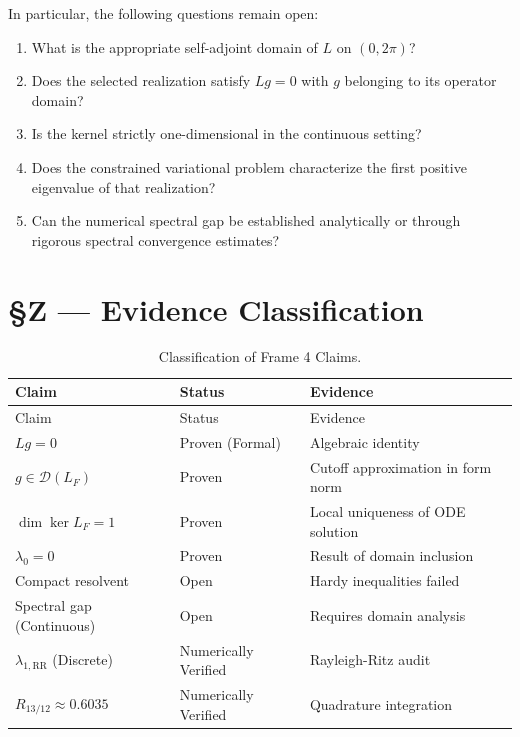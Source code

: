 \documentclass[12pt,a4paper]{article}
\begin{document}
In particular, the following questions remain open:
\begin{enumerate}
    \item What is the appropriate self-adjoint domain of \(L\) on \((0,2\pi)\)?
    \item Does the selected realization satisfy \(Lg=0\) with \(g\) belonging to its operator domain?
    \item Is the kernel strictly one-dimensional in the continuous setting?
    \item Does the constrained variational problem characterize the first positive eigenvalue of that realization?
    \item Can the numerical spectral gap be established analytically or through rigorous spectral convergence estimates?
\end{enumerate}

\section{\S Z — Evidence Classification}\label{sec:audit}

\begin{longtable}{p{4.5cm}p{6cm}p{3cm}}
\caption{Classification of Frame 4 Claims.}\label{tab:audit}\\
\toprule
Claim & Status & Evidence\\
\midrule
\endfirsthead
\toprule
Claim & Status & Evidence\\
\midrule
\endhead
\bottomrule
\endfoot
\(Lg = 0\) & Proven (Formal) & Algebraic identity \\
\(g \in \mathcal{D}(L_F)\) & Proven & Cutoff approximation in form norm \\
\(\dim \ker L_F = 1\) & Proven & Local uniqueness of ODE solution \\
\(\lambda_0 = 0\) & Proven & Result of domain inclusion \\
Compact resolvent & Open & Hardy inequalities failed \\
Spectral gap (Continuous) & Open & Requires domain analysis \\
\(\lambda_{1,\mathrm{RR}}\) (Discrete) & Numerically Verified & Rayleigh-Ritz audit \\
\(R_{13/12} \approx 0.6035\) & Numerically Verified & Quadrature integration \\
\bottomrule
\end{longtable}
\end{document}
